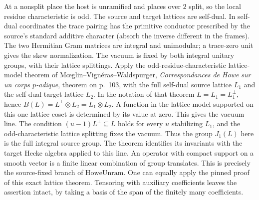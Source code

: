 At a nonsplit place the host is unramified and places over $2$ split,
so the local residue characteristic is odd. The source and target
lattices are self-dual. In self-dual coordinates the trace pairing
has the primitive conductor prescribed by the source's standard
additive character (absorb the inverse different in the frames).
The two Hermitian Gram matrices are integral and unimodular;
a trace-zero unit gives the skew normalization. The vacuum is
fixed by both integral unitary groups, with their lattice splittings.
Apply the odd-residue-characteristic lattice-model theorem of
M\oe glin--Vign\'eras--Waldspurger, \emph{Correspondances de Howe
sur un corps $p$-adique}, theorem on p.~103, with the full self-dual
source lattice $L_1$ and the self-dual target lattice $L_2$.
In the notation of that theorem $L=L_1=L_1^\perp$, hence
$B(L)=L^\perp\otimes L_2=L_1\otimes L_2$. A function in the
lattice model supported on this one lattice coset is determined by
its value at zero. This gives the vacuum line. The condition
$(u-1)L^\perp\subseteq L$ holds for every $u$ stabilizing $L_1$,
and the odd-characteristic lattice splitting fixes the vacuum.
Thus the group $J_1(L)$ here is the full integral source group. The theorem identifies
its invariants with the target Hecke algebra applied to this line.
An operator with compact support on a smooth vector is a finite
linear combination of group translates. This is precisely the
source-fixed branch of $\mathrm{HoweUnram}$. One can equally apply
the pinned proof of this exact lattice theorem. Tensoring with
auxiliary coefficients leaves the assertion intact, by taking a
basis of the span of the finitely many coefficients.

